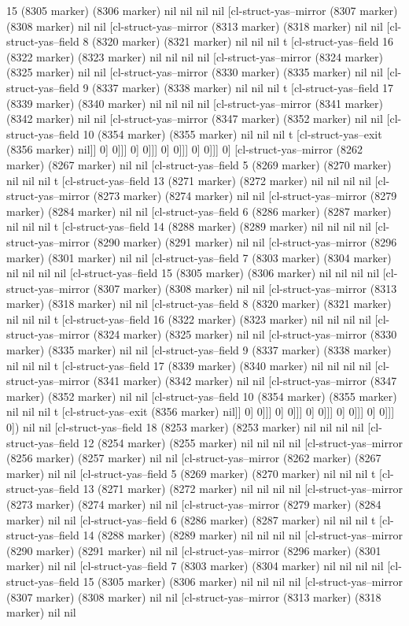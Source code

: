 {{15 (8305 marker) (8306 marker) nil nil nil nil [cl-struct-yas--mirror (8307 marker) (8308 marker) nil nil [cl-struct-yas--mirror (8313 marker) (8318 marker) nil nil [cl-struct-yas--field 8 (8320 marker) (8321 marker) nil nil nil t [cl-struct-yas--field 16 (8322 marker) (8323 marker) nil nil nil nil [cl-struct-yas--mirror (8324 marker) (8325 marker) nil nil [cl-struct-yas--mirror (8330 marker) (8335 marker) nil nil [cl-struct-yas--field 9 (8337 marker) (8338 marker) nil nil nil t [cl-struct-yas--field 17 (8339 marker) (8340 marker) nil nil nil nil [cl-struct-yas--mirror (8341 marker) (8342 marker) nil nil [cl-struct-yas--mirror (8347 marker) (8352 marker) nil nil [cl-struct-yas--field 10 (8354 marker) (8355 marker) nil nil nil t [cl-struct-yas--exit (8356 marker) nil]] 0] 0]]] 0] 0]]] 0] 0]]] 0] 0]]] 0] [cl-struct-yas--mirror (8262 marker) (8267 marker) nil nil [cl-struct-yas--field 5 (8269 marker) (8270 marker) nil nil nil t [cl-struct-yas--field 13 (8271 marker) (8272 marker) nil nil nil nil [cl-struct-yas--mirror (8273 marker) (8274 marker) nil nil [cl-struct-yas--mirror (8279 marker) (8284 marker) nil nil [cl-struct-yas--field 6 (8286 marker) (8287 marker) nil nil nil t [cl-struct-yas--field 14 (8288 marker) (8289 marker) nil nil nil nil [cl-struct-yas--mirror (8290 marker) (8291 marker) nil nil [cl-struct-yas--mirror (8296 marker) (8301 marker) nil nil [cl-struct-yas--field 7 (8303 marker) (8304 marker) nil nil nil nil [cl-struct-yas--field 15 (8305 marker) (8306 marker) nil nil nil nil [cl-struct-yas--mirror (8307 marker) (8308 marker) nil nil [cl-struct-yas--mirror (8313 marker) (8318 marker) nil nil [cl-struct-yas--field 8 (8320 marker) (8321 marker) nil nil nil t [cl-struct-yas--field 16 (8322 marker) (8323 marker) nil nil nil nil [cl-struct-yas--mirror (8324 marker) (8325 marker) nil nil [cl-struct-yas--mirror (8330 marker) (8335 marker) nil nil [cl-struct-yas--field 9 (8337 marker) (8338 marker) nil nil nil t [cl-struct-yas--field 17 (8339 marker) (8340 marker) nil nil nil nil [cl-struct-yas--mirror (8341 marker) (8342 marker) nil nil [cl-struct-yas--mirror (8347 marker) (8352 marker) nil nil [cl-struct-yas--field 10 (8354 marker) (8355 marker) nil nil nil t [cl-struct-yas--exit (8356 marker) nil]] 0] 0]]] 0] 0]]] 0] 0]]] 0] 0]]] 0] 0]]] 0]) nil nil [cl-struct-yas--field 18 (8253 marker) (8253 marker) nil nil nil nil [cl-struct-yas--field 12 (8254 marker) (8255 marker) nil nil nil nil [cl-struct-yas--mirror (8256 marker) (8257 marker) nil nil [cl-struct-yas--mirror (8262 marker) (8267 marker) nil nil [cl-struct-yas--field 5 (8269 marker) (8270 marker) nil nil nil t [cl-struct-yas--field 13 (8271 marker) (8272 marker) nil nil nil nil [cl-struct-yas--mirror (8273 marker) (8274 marker) nil nil [cl-struct-yas--mirror (8279 marker) (8284 marker) nil nil [cl-struct-yas--field 6 (8286 marker) (8287 marker) nil nil nil t [cl-struct-yas--field 14 (8288 marker) (8289 marker) nil nil nil nil [cl-struct-yas--mirror (8290 marker) (8291 marker) nil nil [cl-struct-yas--mirror (8296 marker) (8301 marker) nil nil [cl-struct-yas--field 7 (8303 marker) (8304 marker) nil nil nil nil [cl-struct-yas--field 15 (8305 marker) (8306 marker) nil nil nil nil [cl-struct-yas--mirror (8307 marker) (8308 marker) nil nil [cl-struct-yas--mirror (8313 marker) (8318 marker) nil nil }}
